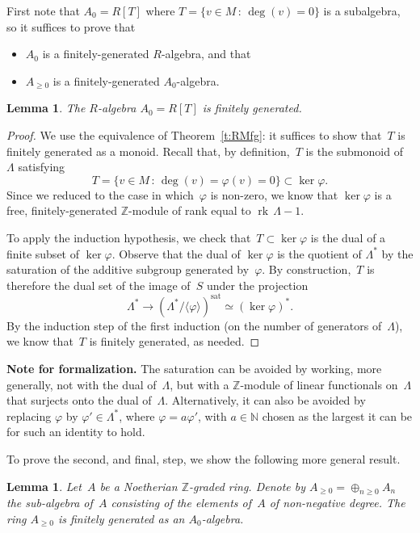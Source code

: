 \documentclass{amsart}
\newcommand{\N}{\mathbb{N}}
\newcommand{\Z}{\mathbb{Z}}
\newcommand{\Az}{A_{\geq0}}
\newcommand{\form}[1]{\medskip
\parbox{330pt}
{\small{{\textbf{Note for formalization.}}
#1}}
\medskip}
\DeclareMathOperator{\rk}{rk\,}
\newtheorem{lemma}[theorem]{Lemma}
\begin{document}
First note that $A_0=R[T]$ where $T=\{v \in M \,:\, \deg(v)=0\}$ is a subalgebra, so it suffices to prove that
\begin{itemize}
\item
$A_0$ is a finitely-generated $R$-algebra, and that
\item
$\Az$ is a finitely-generated $A_0$-algebra.
\end{itemize}

\begin{lemma}
The $R$-algebra $A_0 = R[T]$ is finitely generated.
\end{lemma}
\begin{proof}
We use the equivalence of Theorem~\ref{t:RMfg}: it suffices to show that~$T$ is finitely generated as a monoid.  Recall that, by definition,~$T$ is the submonoid of~$\Lambda$ satisfying
\[
T=\{v \in M \,:\, \deg(v) = \varphi (v) = 0\} \subset \ker \varphi .
\]
Since we reduced to the case in which~$\varphi$ is non-zero, we know that $\ker \varphi$ is a free, finitely-generated $\Z$-module of rank equal to ${\rk} \Lambda - 1$.

To apply the induction hypothesis, we check that~$T \subset \ker \varphi$ is the dual of a finite subset of $\ker \varphi$.  Observe that the dual of $\ker \varphi$ is the quotient of $\Lambda^*$ by the saturation of the additive subgroup generated by~$\varphi$.  By construction,~$T$ is therefore the dual set of the image of~$S$ under the projection
\[
\Lambda^* \to \left( \Lambda^* / \langle \varphi \rangle \right)^{\textrm{sat}} \simeq \left( \ker \varphi \right)^*.
\]
By the induction step of the first induction (on the number of generators of~$\Lambda$), we know that~$T$ is finitely generated, as needed.
\end{proof}


\form{The saturation can be avoided by working, more generally, not with the dual of~$\Lambda$, but with a $\Z$-module of linear functionals on~$\Lambda$ that surjects onto the dual of~$\Lambda$.  Alternatively, it can also be avoided by replacing $\varphi$ by $\varphi' \in \Lambda^*$, where $\varphi = a \varphi'$, with $a \in \N$ chosen as the largest it can be for such an identity to hold.}

To prove the second, and final, step, we show the following more general result.

\begin{lemma}
Let~$A$ be a Noetherian $\Z$-graded ring.  Denote by $\Az = \oplus_{n \geq 0} A_n$ the sub-algebra of~$A$ consisting of the elements of~$A$ of non-negative degree.  The ring $\Az$ is finitely generated as an $A_0$-algebra.
\end{lemma}
\end{document}
